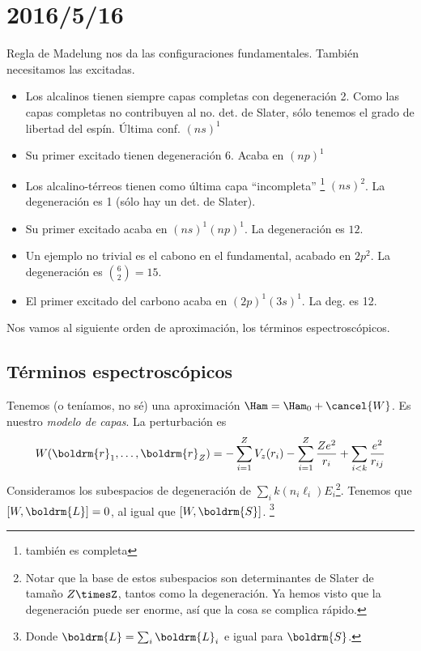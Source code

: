 \section{2016/5/16}
Regla de Madelung nos da las configuraciones fundamentales. También
necesitamos las excitadas.
\begin{itemize}
\item Los alcalinos tienen siempre capas completas con degeneración 2.
  Como las capas completas no contribuyen al no. det. de Slater, sólo
  tenemos el grado de libertad del espín. Última conf. $(ns)^1$
\item Su primer excitado tienen degeneración 6. Acaba en $(np)^1$
\item Los alcalino-térreos tienen como última capa ``incompleta''
 \footnote{también es completa} $(ns)^2$. La degeneración es 1 (sólo
  hay un det. de Slater).
\item Su primer excitado acaba en $(ns)^1(np)^1$. La degeneración es $12$.
\item Un ejemplo no trivial es el cabono en el fundamental, acabado en
  $2p^2$. La degeneración es $\binom{6}{2}=15$.
\item El primer excitado del carbono acaba en $(2p)^1(3s)^1$. La deg. es 12.
\end{itemize}

Nos vamos al siguiente orden de aproximación, los términos
espectroscópicos.

\subsection{Términos espectroscópicos}
Tenemos (o teníamos, no sé) una aproximación $\Ham = \Ham_0 +
\cancel{W}$. Es nuestro \emph{modelo de capas}.
La perturbación es
\begin{equation}
  W(\boldrm{r}_1,\ldots,\boldrm{r}_Z) = - \sum_{i=1}^Z V_z(r_i)-
  \sum_{i=1}^Z \frac{Ze^2}{r_i} + \sum_{i<k} \frac{e^2}{r_{ij}}
\end{equation}
Consideramos los subespacios de degeneración de $\sum_{i}
k(n_i\ell_i)E_i$\footnote{Notar que la base de estos subespacios son
  determinantes de Slater de tamaño $Z\timesZ$, tantos como la
  degeneración. Ya hemos visto que la degeneración puede ser enorme,
  así que la cosa se complica rápido.}.
Tenemos que $[W,\boldrm{L}]=0$, al igual que $[W,\boldrm{S}]$.
\footnote{Donde $\boldrm{L} = \sum_{i} \boldrm{L}_i$ e igual para $\boldrm{S}$.}

